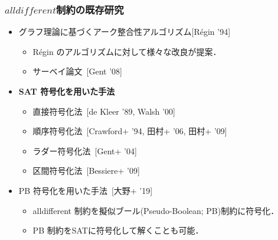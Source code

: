 \documentclass [dvipdfmx,11pt]{beamer}
\newcommand{\alldifferent}{$alldifferent$}
\begin{document}
\begin{frame}
\frametitle{{\alldifferent}制約の既存研究}

\begin{itemize}
\item グラフ理論に基づくアーク整合性アルゴリズム[R\'{e}gin '94]
  \begin{itemize}
  \item R\'{e}gin のアルゴリズムに対して様々な改良が提案．
  \item サーベイ論文~[Gent '08]
  \end{itemize}
\item \alert{\bf SAT 符号化を用いた手法}
  \begin{itemize}
  \item 直接符号化法~[de Kleer '89, Walsh '00]
  \item 順序符号化法~[Crawford+ '94, 田村+ '06, 田村+ '09]
  \item ラダー符号化法~[Gent+ '04]
  \item 区間符号化法~[Bessiere+ '09]
  \end{itemize}
\item PB 符号化を用いた手法~[大野+ '19]
  \begin{itemize}
  \item alldifferent 制約を擬似ブール(Pseudo-Boolean; PB)制約に符号化．
  \item PB 制約をSATに符号化して解くことも可能．
  \end{itemize}
\end{itemize}
\end{frame}


\end{document}
